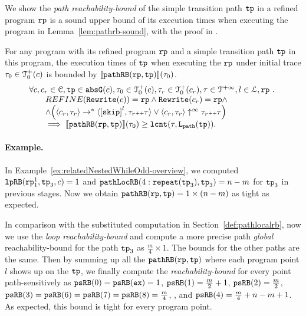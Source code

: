 We show the \emph{path reachability-bound} of the simple transition path $\mathtt{tp}$ in a refined program $\mathtt{rp}$ is a sound upper bound of its execution times when executing the program in Lemma~\ref{lem:pathrb-sound}, with the proof in .
\begin{lem}
  \label{lem:pathrb-sound}
  For any program with its refined program $\mathtt{rp}$ and a simple transition path $\mathtt{tp}$ in this program,
  the execution times of $\mathtt{tp}$ when executing the $\mathtt{rp}$ under initial trace $\mathtt{\tau}_0 \in \mathcal{T}^{+}_0(c)$ is bounded by $\llbracket \mathtt{pathRB}(\mathtt{rp}, \mathtt{tp}) \rrbracket(\mathtt{\tau}_0)$.
  \[
    \begin{array}{l}
    \forall c, c_r \in \cdom, \tpath \in \absG(c), \trace_0 \in \ftdom_0(c),  \trace_r \in \ftdom_0(c_r), \trace \in \tdom, l \in \ldom, \rprog \st 
    \\ \qquad
    REFINE(\algrewrite(c)) = \rprog
    \land 
    \algrewrite(c_r) = \rprog
    \land
    \\ \qquad
    \land 
    \Big(
      \config{c_r, \trace_r} \rightarrow^* \config{\clabel{\eskip}^{l}, \trace_r \tracecat \trace}
      \lor \config{c_r, \trace_r} \uparrow^{\infty} \trace_r \tracecat \trace 
      \Big)
  \\ \qquad
    \implies
    \econfig{\inoutB(\rprog, \tpath)}(\trace_0) \geq \lcounter(\trace, \pathl(\tpath)).
    \end{array}
  \]  
\end{lem}
\paragraph{Example.}
In Example~\ref{ex:relatedNestedWhileOdd-overview}, we computed $\mathtt{lpRB}(\mathtt{rp}_1^1, \mathtt{tp}_3, c) = 1$ and
$\mathtt{pathLocRB}(4: \mathtt{repeat}(\mathtt{tp}_3), \mathtt{tp}_3) = n - m$ for $\mathtt{tp}_3$ in previous stages. Now we obtain $\mathtt{pathRB}(\mathtt{rp}, \mathtt{tp}) = 1 \times (n - m)$ as tight as expected.

In comparison with the substituted computation in Section~\ref{def:pathlocalrb}, now we use the \emph{loop reachability-bound}
and compute a more precise path \emph{global} reachability-bound for the path $\mathtt{tp}_3$ as $\frac{m}{4} \times 1$.
The bounds for the other paths are the same.
Then by summing up all the $\mathtt{pathRB}(\mathtt{rp}, \mathtt{tp})$ where each program point $l$ shows up on the $\mathtt{tp}$, we finally compute
the \emph{reachability-bound} for every point path-sensitively as
$\mathtt{psRB}(0) = \mathtt{psRB}(\mathtt{ex}) = 1$,
$\mathtt{psRB}(1) = \frac{m}{2} + 1$,
$\mathtt{psRB}(2) = \frac{m}{2} $, 
$\mathtt{psRB}(3) = \mathtt{psRB}(6) = \mathtt{psRB}(7)  = \mathtt{psRB}(8) = \frac{m}{4} $,
,
and $\mathtt{psRB}(4) =  \frac{m}{4} + n - m + 1$.
As expected, this bound is tight for every program point.
